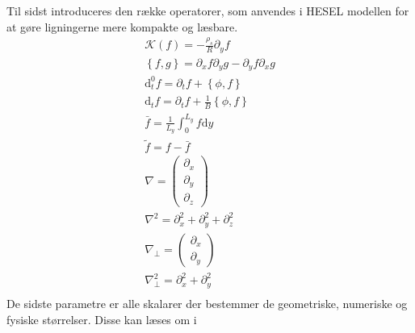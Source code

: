 Til sidst introduceres den række operatorer, som anvendes i HESEL modellen for at gøre ligningerne mere kompakte og læsbare.
\begin{gather}
    \mathcal{K}(f)= - \frac{\rho_s}{R}\partial_y f \label{curvature}\\
    \left\{ f, g\right\} = \partial_x f \partial_y g - \partial_y f \partial_x g \label{poission}\\
    \mathrm{d}_t^0 f = \partial_t f + \left\{\phi, f \right\} \label{dt0}\\
    \mathrm{d}_t f = \partial_t f  + \frac{1}{B}  \left\{ \phi , f \right\} \label{dt} \\    
    \bar f = \frac{1}{L_y}\int_0^{L_y} f \mathrm{d}y \label{bar}\\
    \tilde f = f - \bar f\label{tilde}\\
    \nabla = \begin{pmatrix} \partial_x \\ \partial_y \\ \partial_z \end{pmatrix} \label{nabla} \\
    \nabla^2 = \partial_x^2 + \partial_y^2 + \partial_z^2 \label{nabla2}\\
    \nabla_\perp = \begin{pmatrix} \partial_x \\ \partial_y \end{pmatrix} \label{nable_perp}\\
    \nabla_\perp^2 = \partial_x^2 + \partial_y^2 \label{nabla2_perp}\\
\end{gather}
De sidste parametre er alle skalarer der bestemmer de geometriske, numeriske og fysiske størrelser. Disse kan læses om i \cite{udledning_af_hesel}


\newpage
